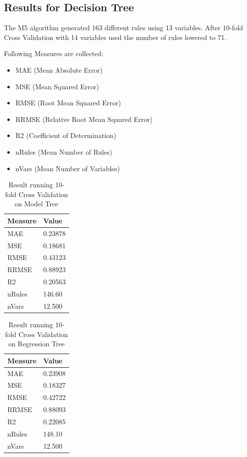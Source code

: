 \documentclass{article}
\begin{document}
\subsection{Results for Decision Tree}
The M5 algorithm generated 163 different rules using 13 variables.
\break After 10-fold Cross Validation with 14 variables used the number of rules lowered to 71.

\bigskip
Following Measures are collected:
\begin{itemize}
	\item MAE (Mean Absolute Error)
	\item MSE (Mean Squared Error)
	\item RMSE (Root Mean Squared Error)
	\item RRMSE (Relative Root Mean Squared Error)
	\item R2 (Coefficient of Determination)
	\item nRules (Mean Number of Rules)
	\item nVars (Mean Number of Variables)
\end{itemize}

\begin{table}[H]
	\centering
	\caption{Result running 10-fold Cross Validation on Model Tree}
	\label{tab:Key-Indicator-DT}
	\begin{tabular}{|l|l|}
		\hline
		\textbf{Measure} & \textbf{Value} \\ \hline
		MAE       		& 0.23878 \\ \hline
		MSE       		& 0.18681 \\ \hline
		RMSE       		& 0.43123 \\ \hline
		RRMSE       	& 0.88923 \\ \hline
		R2       		& 0.20563 \\ \hline
		nRules       	& 146.60  \\ \hline
		nVars       	& 12.500  \\ \hline
	\end{tabular}
\end{table}

\begin{table}[H]
	\centering
	\caption{Result running 10-fold Cross Validation on Regression Tree}
	\label{tab:Key-Indicator-PT}
	\begin{tabular}{|l|l|}
		\hline
		\textbf{Measure} 	& \textbf{Value} \\ \hline
		MAE       			& 0.23908 		 \\ \hline
		MSE       			& 0.18327 		 \\ \hline
		RMSE       			& 0.42722		 \\ \hline
		RRMSE       		& 0.88093 	  	 \\ \hline
		R2       			& 0.22085  	 	 \\ \hline
		nRules       		& 148.10   		 \\ \hline
		nVars       		& 12.500   		 \\ \hline
	\end{tabular}
\end{table}
\end{document}
